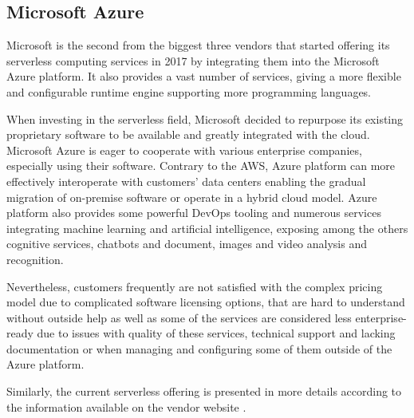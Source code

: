 \subsection{Microsoft Azure}

Microsoft is the second from the biggest three vendors that started offering its serverless computing services in 2017 by integrating them into the Microsoft Azure platform. It also provides a vast number of services, giving a more flexible and configurable runtime engine supporting more programming languages.

When investing in the serverless field, Microsoft decided to repurpose its existing proprietary software to be available and greatly integrated with the cloud. Microsoft Azure is eager to cooperate with various enterprise companies, especially using their software. Contrary to the AWS, Azure platform can more effectively interoperate with customers' data centers enabling the gradual migration of on-premise software or operate in a hybrid cloud model. Azure platform also provides some powerful DevOps tooling and numerous services integrating machine learning and artificial intelligence, exposing among the others cognitive services, chatbots and document, images and video analysis and recognition.

Nevertheless, customers frequently are not satisfied with the complex pricing model due to complicated software licensing options, that are hard to understand without outside help as well as some of the services are considered less enterprise-ready due to issues with quality of these services, technical support and lacking documentation or when managing and configuring some of them outside of the Azure platform.

Similarly, the current serverless offering is presented in more details according to the information available on the vendor website \cite{AzureServerlessOffering}.


